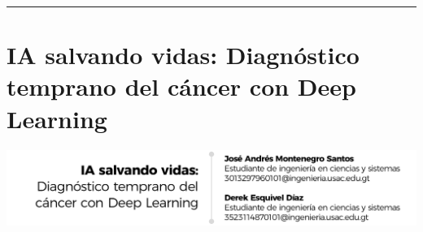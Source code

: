 \documentclass[12pt,spanish,Letterpaper,openany]{book}
\newcommand{\HRule}{\begin{center}\rule{0.5\linewidth}{0.2mm}\end{center}}
\begin{document}
\medskip

\HRule

\medskip

\hypertarget{pareja02}{%
\chapter{IA salvando vidas: Diagnóstico temprano del cáncer con Deep Learning}\label{pareja02}}

\begin{center}\includegraphics[width=1\linewidth]{autores/pareja21_01} \end{center}
\end{document}
